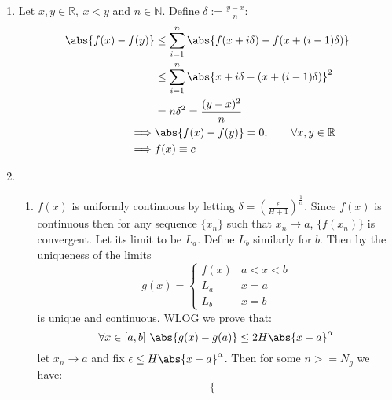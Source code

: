 \begin{enumerate}
    \item \label{P1}
          Let \(x,y \in \mathbb{R}, \ x < y\) and \(n \in \mathbb{N}\). Define \(\delta  := \frac{y - x}{n}\):
          \begin{align}
              \abs{f(x)  - f(y)} & \leq \sum_{i = 1}^{n}{\abs{f(x + i\delta) - f(x + (i-1)\delta)}} \\
                                 & \leq \sum_{i = 1}^{n}{\abs{x + i\delta - (x + (i-1)\delta)}^2}   \\
                                 & = n \delta^2 = \dfrac{(y -x)^2}{n}                               \\
              \implies           & \abs{f(x) - f(y)} = 0,\qquad \forall x,y \in \mathbb{R}          \\
              \implies           & f(x) \equiv c
          \end{align}
    \item \leavevmode
          \begin{enumerate}
              \item
                    \(f(x)\) is uniformly continuous by letting \(\delta = \left(\frac{\epsilon}{H + 1}\right)^\frac{1}{\alpha}\). Since \(f(x)\) is continuous then for any sequence \(\{x_n\}\) such that \(x_n \to a\), \(\{f(x_n)\}\) is convergent. Let its limit to be \(L_a\). Define \(L_b\) similarly for \(b\). Then by the uniqueness of the limits
                    \begin{equation}
                        g(x) = \begin{cases}
                            f(x) & a < x < b \\
                            L_a  & x = a     \\
                            L_b  & x = b
                        \end{cases}
                    \end{equation}
                    is unique and continuous. WLOG we prove that:
                    \begin{equation}
                        \forall x \in [a,b] \ \abs{g(x) - g(a)} \leq 2H\abs{x - a}^\alpha
                    \end{equation}
                    let \(x_n \to a\) and fix \(\epsilon \leq H\abs{x - a}^\alpha\). Then for some \(n >= N_g\) we have:
                    \begin{equation}
                        \begin{cases}

\end{cases}
\end{equation}
\end{enumerate}
\end{enumerate}
